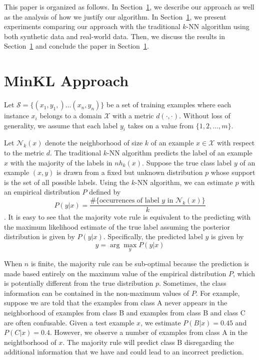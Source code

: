 \documentclass{article}
\begin{document}
This paper is organized as follows. In Section~\ref{}, we describe our
approach as well as the analysis of how we justify our algorithm. In
Section~\ref{}, we present experiments comparing our approach with the
traditional $k$-NN algorithm using both synthetic data and real-world
data. Then, we discuss the results in Section~\ref{} and conclude the
paper in Section~\ref{}.

\section{MinKL Approach}

\newcommand{\X}{\mathcal{X}}
\newcommand{\Y}{\mathcal{Y}}
\newcommand{\D}{\mathcal{D}}
\newcommand{\trainset}{\mathcal{S}}
\newcommand{\nh}{\mathcal{N}}

Let $\trainset = \{ (x_1,y_1,) \ldots (x_n,y_n)\}$ be a set of training
examples where each instance $x_i$ belongs to a domain $\X$ with a
metric $d(\cdot,\cdot)$. Without loss of generality, we assume that
each label $y_i$ takes on a value from $\{1,2,\ldots,m\}$. 

Let $\nh_k(x)$ denote the neighborhood of size $k$ of an example $x
\in \X$ with respect to the metric $d$. The traditional $k$-NN
algorithm predicts the label of an example $x$ with the majority of
the labels in $nh_k(x)$. Suppose the true class label $y$ of an
example $(x,y)$ is drawn from a fixed but unknown distribution $p$
whose support is the set of all possible labels. Using the $k$-NN
algorithm, we can estimate $p$ with an empirical distribution $P$
defined by
\[
P(y|x) = \frac{\#\{ \mbox{occurrences of label } y \mbox{ in } \nh_k(x)\}}{k}
\].  It is easy to see that the majority vote rule is equivalent to
the predicting with the maximum likelihood estimate of the true label
assuming the posterior distribution is given by
$P(y|x)$. Specifically, the predicted label $\hat{y}$ is given by
\[
\hat{y} = \arg\max_y P(y|x)
\]

When $n$ is finite, the majority rule can be sub-optimal because the
prediction is made based entirely on the maximum value of the
empirical distribution $P$, which is potentially different from the
true distribution $p$. Sometimes, the class information can be
contained in the non-maximum values of $P$. For example, suppose we
are told that the examples from class A never appears in the
neighborhood of examples from class B and examples from class B and
class C are often confusable. Given a test example $x$, we estimate
$P(B | x) = 0.45$ and $P(C | x) = 0.4$. However, we observe a number
of examples from class A in the neightborhood of $x$. The majority
rule will predict class B disregarding the additional information that
we have and could lead to an incorrect prediction.
\end{document}
